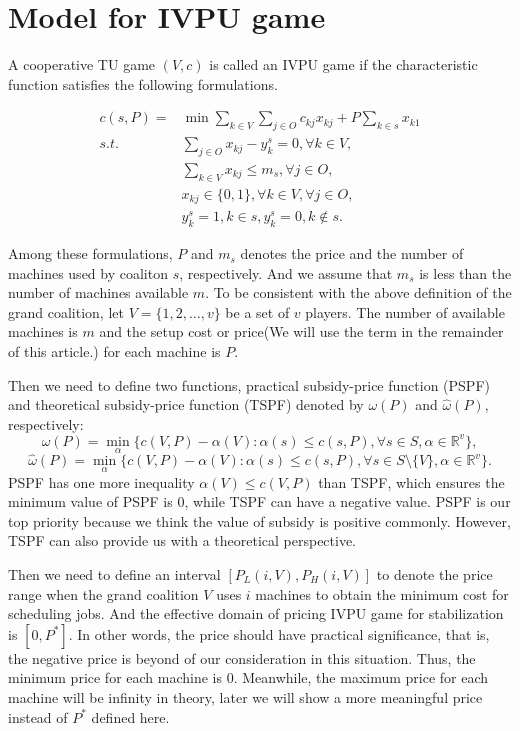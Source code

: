 \section*{Model for IVPU game}

A cooperative TU game $(V,c)$ is called an IVPU game if the characteristic function satisfies the following formulations.

\[
\begin{aligned}
c(s,P) = & {\min} \sum_{k\in V}\sum_{j\in O} {c_{kj} x_{kj}} + {P\sum_{k\in s} x_{k1}} \\
{s.t.}\quad & \sum_{j \in O} x_{kj}-y_k^s=0, \forall k \in V, \\
& \sum_{k\in V} x_{kj} \leq m_s,\forall j \in O,  \\
& x_{kj} \in \{0,1\} , \forall k \in V, \forall j \in O,\\
& y_k^s=1, k \in s, y_k^s=0, k \notin s.
\end{aligned}
\]

Among these formulations, $P$ and $m_s$ denotes the price and the number of machines used by coaliton $s$, respectively. And we assume that $m_s$ is less than the number of machines available $m$.
To be consistent with the above definition of the grand coalition, let $V=\{1,2,\ldots,v\}$ be a set of $v$ players. The number of available machines is $m$ and the setup cost or price(We will use the term in the remainder of this article.) for each machine is $P$.

Then we need to define two functions, practical subsidy-price function (PSPF) and theoretical subsidy-price function (TSPF) denoted by $\omega(P)$ and $\hat{\omega}(P)$, respectively:
\[
  {\omega(P)}=\mathop{\min}_{\alpha}\{c(V,P)-\alpha(V): \alpha(s) \leq c(s,P)
 ,\forall s \in S, \alpha\in\mathbb{R}^{v}\},
\]
\[
  {\hat{\omega}(P)}=\mathop{\min}_{\alpha}\{c(V,P)-\alpha(V): \alpha(s) \leq c(s,P)
 ,\forall s \in S\setminus\{V\}, \alpha\in\mathbb{R}^{v}\}.
\]
PSPF has one more inequality $\alpha(V)\leq c(V,P)$ than TSPF, which ensures the minimum value of PSPF is 0, while TSPF can have a negative value. PSPF is our top priority because we think the value of subsidy is positive commonly. However, TSPF can also provide us with a theoretical perspective.

Then we need to define an interval $[P_L(i,V),P_H(i,V)]$ to denote the price range when the grand coalition $V$ uses $i$ machines to obtain the minimum cost for scheduling jobs. And the effective domain of pricing IVPU game for stabilization is $[0,P^*]$.
In other words, the price should have practical significance, that is, the negative price is beyond of our consideration in this situation. Thus, the minimum price for each machine is 0. Meanwhile, the maximum price for each machine will be infinity in theory, later we will show a more meaningful price instead of $P^*$ defined here.

